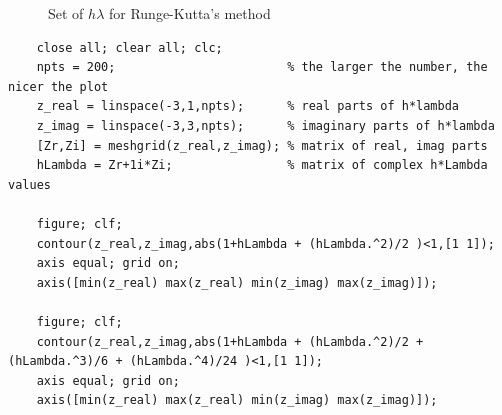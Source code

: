 \documentclass[14pt,a4paper]{article}
\begin{document}
\begin{enumerate}
\begin{figure}[htp]
		\caption{Set of $h\lambda$ for Runge-Kutta's method}
	\end{figure}
	\begin{lstlisting}
	close all; clear all; clc;
	npts = 200;                        % the larger the number, the nicer the plot
	z_real = linspace(-3,1,npts);      % real parts of h*lambda
	z_imag = linspace(-3,3,npts);      % imaginary parts of h*lambda
	[Zr,Zi] = meshgrid(z_real,z_imag); % matrix of real, imag parts
	hLambda = Zr+1i*Zi;                % matrix of complex h*Lambda values
		
	figure; clf;
	contour(z_real,z_imag,abs(1+hLambda + (hLambda.^2)/2 )<1,[1 1]);
	axis equal; grid on;
	axis([min(z_real) max(z_real) min(z_imag) max(z_imag)]);
	
	figure; clf;
	contour(z_real,z_imag,abs(1+hLambda + (hLambda.^2)/2 + (hLambda.^3)/6 + (hLambda.^4)/24 )<1,[1 1]);
	axis equal; grid on;
	axis([min(z_real) max(z_real) min(z_imag) max(z_imag)]);
	
	\end{lstlisting}
		
\end{enumerate}
\end{document}
